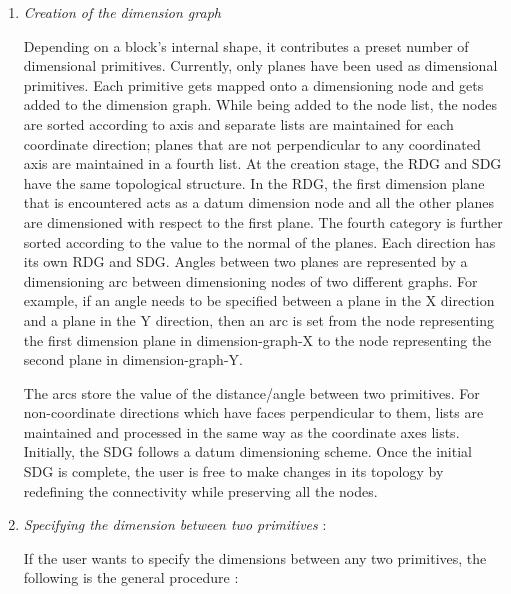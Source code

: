            \begin{enumerate}

            \item
            {\em Creation of the dimension graph }

                Depending on a block's internal shape, it contributes
                a preset number of dimensional primitives. Currently, only 
				planes
                have been used as dimensional primitives. Each primitive 
                gets mapped onto a dimensioning node and gets added to the
                dimension graph. While being added to the node list, the nodes
                are sorted according to axis and separate lists are
                maintained for each coordinate direction; planes that are not
				perpendicular to any coordinated axis are maintained in a
				fourth list. At the creation stage, the RDG and SDG have 
				the same 
				topological structure. In the RDG, the first dimension plane
				that is encountered acts as a datum dimension node and all the 
				other
				planes are dimensioned with respect to the first plane.
				The fourth category is further sorted according to the value
				to the normal of the planes. Each direction has its own RDG
				and SDG. Angles between two planes are represented by a
				dimensioning arc between dimensioning nodes of two different
				graphs. For example, if an angle needs to be specified between
				a plane in the X direction and a plane in the Y direction, 
				then an arc
				is set from the node representing the first dimension plane
				in dimension-graph-X to the node representing the 
				second plane in dimension-graph-Y.
				
				
                The arcs store the value of the distance/angle between two 
				primitives. For non-coordinate directions which have faces
				perpendicular to them, lists are maintained and processed in 
				the 
				same way as the coordinate axes lists. Initially, the SDG 
				follows a datum dimensioning scheme. Once the initial SDG is
				complete, the user is free to make changes in its topology
				by redefining the connectivity while preserving all the
				nodes.
				
				\item
                    {\em Specifying the dimension between two primitives} :

                    If the user wants to specify the dimensions between any two
                    primitives, the following is the general procedure :


\end{enumerate}
